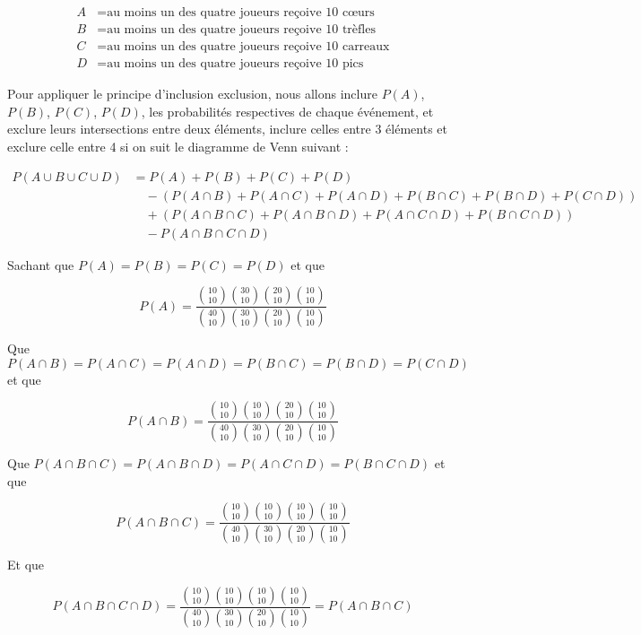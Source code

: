 \documentclass[8pt]{report}
\begin{document}
\begin{align*}
A &= \text{au moins un des quatre joueurs reçoive 10 cœurs} \\
B &= \text{au moins un des quatre joueurs reçoive 10 trèfles} \\
C &= \text{au moins un des quatre joueurs reçoive 10 carreaux} \\
D &= \text{au moins un des quatre joueurs reçoive 10 pics}
\end{align*}

Pour appliquer le principe d'inclusion exclusion, nous allons inclure $P(A)$, $P(B)$, $P(C)$, $P(D)$, les probabilités respectives de chaque événement, et exclure leurs intersections entre deux éléments, inclure celles entre 3 éléments et exclure celle entre 4 si on suit le diagramme de Venn suivant :

\begin{align*}
P(A \cup B \cup C \cup D) &= P(A) + P(B) + P(C) + P(D) \\
&\quad - (P(A \cap B) + P(A \cap C) + P(A \cap D) + P(B \cap C) + P(B \cap D) + P(C \cap D)) \\
&\quad + (P(A \cap B \cap C) + P(A \cap B \cap D) + P(A \cap C \cap D) + P(B \cap C \cap D)) \\
&\quad - P(A \cap B \cap C \cap D)
\end{align*}

Sachant que $P(A) = P(B) = P(C) = P(D)$ et que

\[
P(A) = \dfrac{{\binom{10}{10}\binom{30}{10}\binom{20}{10}\binom{10}{10}}}{{\binom{40}{10}\binom{30}{10}\binom{20}{10}\binom{10}{10}}}
\]

Que $P(A \cap B) = P(A \cap C) = P(A \cap D) = P(B \cap C) = P(B \cap D) = P(C \cap D)$ et que

\[
P(A \cap B) = \dfrac{{\binom{10}{10}\binom{10}{10}\binom{20}{10}\binom{10}{10}}}{{\binom{40}{10}\binom{30}{10}\binom{20}{10}\binom{10}{10}}}
\]

Que $P(A \cap B \cap C) = P(A \cap B \cap D) = P(A \cap C \cap D) = P(B \cap C \cap D)$ et que

\[
P(A \cap B \cap C) = \dfrac{{\binom{10}{10}\binom{10}{10}\binom{10}{10}\binom{10}{10}}}{{\binom{40}{10}\binom{30}{10}\binom{20}{10}\binom{10}{10}}}
\]

Et que

\[
P(A \cap B \cap C \cap D) = \dfrac{{\binom{10}{10}\binom{10}{10}\binom{10}{10}\binom{10}{10}}}{{\binom{40}{10}\binom{30}{10}\binom{20}{10}\binom{10}{10}}} = P(A \cap B \cap C)
\]
\end{document}
